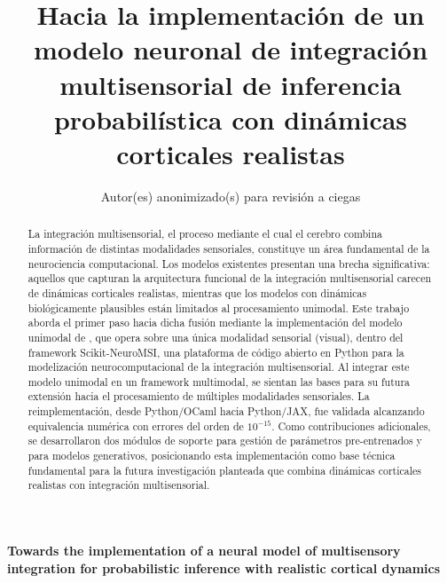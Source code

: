 \documentclass{llncs}
\begin{document}
\title{Hacia la implementación de un modelo neuronal de integración
multisensorial de inferencia probabilística con dinámicas corticales
realistas}

\author{Autor(es) anonimizado(s) para revisión a ciegas}


\maketitle

\renewcommand{\abstractname}{Resumen}
\begin{abstract}
La integración multisensorial, el proceso mediante el cual el
cerebro combina información de distintas modalidades sensoriales,
constituye un área fundamental de la neurociencia computacional. Los
modelos existentes presentan una brecha significativa: aquellos que
capturan la arquitectura funcional de la integración multisensorial
carecen de dinámicas corticales realistas, mientras que los modelos
con dinámicas biológicamente plausibles están limitados al
procesamiento unimodal. Este trabajo aborda el primer paso hacia dicha fusión mediante la
implementación del modelo unimodal de \citet{echeveste2020cortical},
que opera sobre una única modalidad sensorial (visual), dentro del
framework Scikit-NeuroMSI, una plataforma de código abierto en Python
para la modelización neurocomputacional de la integración
multisensorial. Al integrar este modelo unimodal en un framework
multimodal, se sientan las bases para su futura extensión hacia el
procesamiento de múltiples modalidades sensoriales. La
reimplementación, desde Python/OCaml hacia Python/JAX, fue validada
alcanzando equivalencia numérica con errores del orden de
$10^{-15}$. Como contribuciones adicionales, se
desarrollaron dos módulos de soporte para gestión de parámetros
pre-entrenados y para modelos generativos, posicionando esta
implementación como base técnica fundamental para la futura
investigación planteada que combina dinámicas corticales realistas
con integración multisensorial.
\end{abstract}

\begin{center}
\Large\bfseries
Towards the implementation of a neural model of multisensory
integration for probabilistic inference with realistic cortical
dynamics
\end{center}
\end{document}
